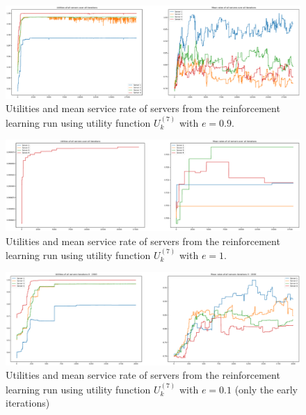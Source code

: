 \begin{figure}[H]
    \includegraphics[width=\textwidth]{chapters/00_appendix/03_more_rl_results/Bin/utility_7_eps/u7_1_e09.eps}
    \caption{Utilities and mean service rate of servers from the reinforcement
    learning run using utility function \(U_k^{(7)}\) with \(e = 0.9\).}
    \label{fig:RL_utility7_1_e09}
\end{figure}


\begin{figure}[H]
    \includegraphics[width=\textwidth]{chapters/00_appendix/03_more_rl_results/Bin/utility_7_eps/u7_1_e1.eps}
    \caption{Utilities and mean service rate of servers from the reinforcement
    learning run using utility function \(U_k^{(7)}\) with \(e = 1\).}
    \label{fig:RL_utility7_1_e1}
\end{figure}


\begin{figure}[H]
    \includegraphics[width=\textwidth]{chapters/00_appendix/03_more_rl_results/Bin/utility_7_eps/u7_2_e01_early_iter.eps}
    \caption{Utilities and mean service rate of servers from the reinforcement
    learning run using utility function \(U_k^{(7)}\) with \(e = 0.1\) (only
    the early iterations)}
    \label{fig:RL_utility7_2_e01_early_iter}
\end{figure}


